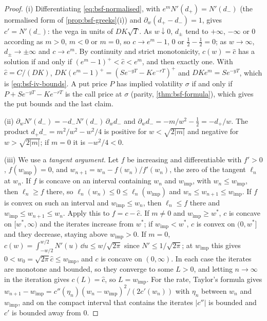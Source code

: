 \begin{proof}
(i) Differentiating \eqref{eq:bsf-normalised}, with $e^mN'(d_+)=N'(d_-)$ (the normalised form of
\cref{prop:bsf-greeks}(i)) and $\partial_w(d_+-d_-)=1$, gives $c'=N'(d_-)$: the vega in units of
$DK\sqrt T$. As $w\downarrow0$, $d_\pm$ tend to $+\infty$, $-\infty$ or $0$ according as $m>0$, $m<0$ or
$m=0$, so $c\to e^m-1$, $0$ or $\frac12-\frac12=0$; as $w\to\infty$, $d_\pm\to\pm\infty$ and $c\to e^m$. By
continuity and strict monotonicity, $c(w)=\hat c$ has a solution if and only if $(e^m-1)^+<\hat c<e^m$, and
then exactly one. With $\hat c=C/(DK)$, $DK(e^m-1)^+=(Se^{-yT}-Ke^{-rT})^+$ and $DKe^m=Se^{-yT}$, which is
\eqref{eq:bsf-iv-bounds}. A put price $P$ has implied volatility $\sigma$ if and only if
$P+Se^{-yT}-Ke^{-rT}$ is the call price at $\sigma$ (parity, \cref{thm:bsf-formula}), which gives the put
bounds and the last claim.

(ii) $\partial_wN'(d_-)=-d_-N'(d_-)\,\partial_wd_-$ and $\partial_wd_-=-m/w^2-\frac12=-d_+/w$. The product
$d_+d_-=m^2/w^2-w^2/4$ is positive for $w<\sqrt{2|m|}$ and negative for $w>\sqrt{2|m|}$; if $m=0$ it is
$-w^2/4<0$.

(iii) We use a \emph{tangent argument}. Let $f$ be increasing and differentiable with $f'>0$, $f(w_{\mathrm{imp}})=0$, and
$w_{n+1}=w_n-f(w_n)/f'(w_n)$, the zero of the tangent $\ell_n$ at $w_n$. If $f$ is concave on an interval
containing $w_n$ and $w_{\mathrm{imp}}$, with $w_n\le w_{\mathrm{imp}}$, then $\ell_n\ge f$ there, so $\ell_n(w_n)\le0\le\ell_n(w_{\mathrm{imp}})$ and
$w_n\le w_{n+1}\le w_{\mathrm{imp}}$. If $f$ is convex on such an interval and $w_{\mathrm{imp}}\le w_n$, then
$\ell_n\le f$ there and $w_{\mathrm{imp}}\le w_{n+1}\le w_n$. Apply this to $f=c-\hat c$. If $m\ne0$ and
$w_{\mathrm{imp}}\ge w^*$, $c$ is concave on $[w^*,\infty)$ and the iterates increase from $w^*$; if
$w_{\mathrm{imp}}<w^*$, $c$ is convex on $(0,w^*]$ and they decrease, staying above $w_{\mathrm{imp}}>0$. If $m=0$,
$c(w)=\int_{-w/2}^{w/2}N'(u)\,\dd u\le w/\sqrt{2\pi}$ since $N'\le1/\sqrt{2\pi}$; at $w_{\mathrm{imp}}$ this gives
$0<w_0=\sqrt{2\pi}\hat c\le w_{\mathrm{imp}}$, and $c$ is concave on $(0,\infty)$. In each case the iterates are
monotone and bounded, so they converge to some $L>0$, and letting $n\to\infty$ in the iteration gives
$c(L)=\hat c$, so $L=w_{\mathrm{imp}}$. For the rate, Taylor's formula gives
$w_{n+1}-w_{\mathrm{imp}}=c''(\eta_n)(w_n-w_{\mathrm{imp}})^2/(2c'(w_n))$ with $\eta_n$ between $w_n$ and $w_{\mathrm{imp}}$,
and on the compact interval that contains the iterates $|c''|$ is bounded and $c'$ is bounded away from $0$.


\end{proof}
